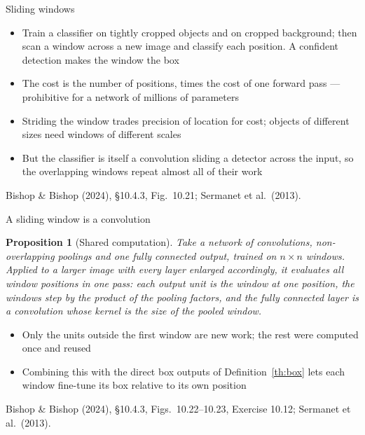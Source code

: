 \documentclass[aspectratio=169, 11pt]{beamer}
\newtheorem{propx}[theorem]{Proposition}
\newcommand{\srcline}[1]{%
  \par\vspace{0.25em}%
  {\scriptsize\color{mcMuted}\hfill #1\par}}
\begin{document}
\begin{frame}{Sliding windows}
  \vspace{0.1em}
  {\footnotesize
  \begin{itemize}\itemsep0.30em
    \item Train a classifier on tightly cropped objects and on cropped
          background; then \alert{scan} a window across a new image and
          classify each position. A confident detection makes the
          window the box
    \item The cost is the number of positions, times the cost of one
          forward pass --- prohibitive for a network of millions of
          parameters
    \item Striding the window trades precision of location for cost;
          objects of different sizes need windows of different scales
    \item But the classifier is itself a convolution sliding a detector
          across the input, so the overlapping windows repeat almost
          all of their work
  \end{itemize}}
  \srcline{Bishop \& Bishop (2024), \S10.4.3, Fig.~10.21; Sermanet et al.\ (2013).}
\end{frame}

\begin{frame}{A sliding window is a convolution}
  \vspace{-0.3em}
  \begin{propx}[Shared computation]\label{th:slide}
    \small
    Take a network of convolutions, non-overlapping poolings and one
    fully connected output, trained on $n \times n$ windows. Applied to
    a larger image with every layer enlarged accordingly, it evaluates
    all window positions in one pass: each output unit is the window
    at one position, the windows step by the product of the pooling
    factors, and the fully connected layer is a convolution whose
    kernel is the size of the pooled window.
  \end{propx}
  \vspace{0.15em}
  {\footnotesize
  \begin{itemize}\itemsep0.22em
    \item Only the units outside the first window are new work; the
          rest were computed once and reused
    \item Combining this with the direct box outputs of
          Definition~\ref{th:box} lets each window fine-tune its box
          relative to its own position
  \end{itemize}}
  \srcline{Bishop \& Bishop (2024), \S10.4.3, Figs.~10.22--10.23,
  Exercise 10.12; Sermanet et al.\ (2013).}
\end{frame}
\end{document}
